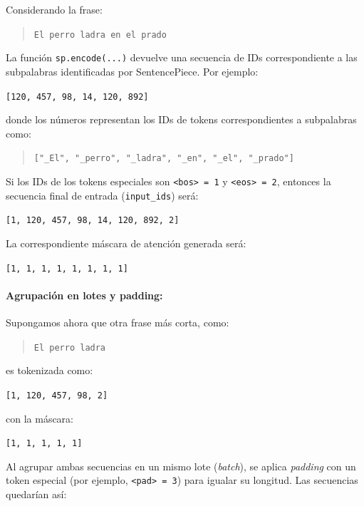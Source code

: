 \documentclass[11pt]{book}
\theoremstyle{plain}
\theoremstyle{definition}
\begin{document}
Considerando la frase:

\begin{quote}
\texttt{El perro ladra en el prado}
\end{quote}

La función \texttt{sp.encode(...)} devuelve una secuencia de IDs correspondiente a las subpalabras identificadas por SentencePiece. Por ejemplo:

\begin{center}
\texttt{[120, 457, 98, 14, 120, 892]}
\end{center}

donde los números representan los IDs de tokens correspondientes a subpalabras como:

\begin{quote}
\texttt{["\_El", "\_perro", "\_ladra", "\_en", "\_el", "\_prado"]}
\end{quote}

Si los IDs de los tokens especiales son \texttt{<bos> = 1} y \texttt{<eos> = 2}, entonces la secuencia final de entrada (\texttt{input\_ids}) será:

\begin{center}
\texttt{[1, 120, 457, 98, 14, 120, 892, 2]}
\end{center}

La correspondiente máscara de atención generada será:

\begin{center}
\texttt{[1, 1, 1, 1, 1, 1, 1, 1]}
\end{center}

\paragraph{Agrupación en lotes y padding:}

Supongamos ahora que otra frase más corta, como:

\begin{quote}
\texttt{El perro ladra}
\end{quote}

es tokenizada como:

\begin{center}
\texttt{[1, 120, 457, 98, 2]}
\end{center}

con la máscara:

\begin{center}
\texttt{[1, 1, 1, 1, 1]}
\end{center}

Al agrupar ambas secuencias en un mismo lote (\textit{batch}), se aplica \textit{padding} con un token especial (por ejemplo, \texttt{<pad> = 3}) para igualar su longitud. Las secuencias quedarían así:
\end{document}
